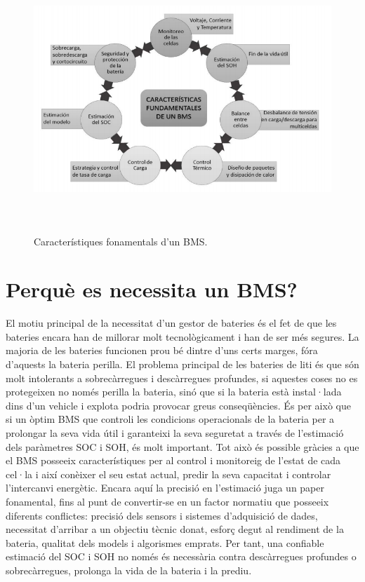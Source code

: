 \begin{figure}[H]
	\centering
    \includegraphics[width=\textwidth, height=10cm] {BMS/diagramabms.png}
    \caption{Característiques fonamentals d'un BMS.}
\end{figure}

\section{Perquè es necessita un BMS?}
El motiu principal de la necessitat d'un gestor de bateries és el fet de que les bateries encara han de millorar molt tecnològicament i han de ser més segures. La majoria de les bateries funcionen prou bé dintre d'uns certs marges, fóra d'aquests la bateria perilla. El problema principal de les bateries de liti és que són molt intolerants a sobrecàrregues i descàrregues profundes, si aquestes coses no es protegeixen no només perilla la bateria, sinó que si la bateria està instal·lada dins d'un vehicle i explota podria provocar greus conseqüències. És per això que si un òptim BMS que controli les condicions operacionals de la bateria per a prolongar la seva vida útil i garanteixi la seva seguretat a través de l'estimació dels paràmetres SOC i SOH, és molt important. 
Tot això és possible gràcies a que el BMS posseeix característiques per al control i monitoreig de l'estat de cada cel·la i així conèixer el seu estat actual, predir la seva capacitat i controlar l'intercanvi energètic. Encara aquí la precisió en l'estimació juga un paper fonamental, fins al punt de convertir-se en un factor normatiu que posseeix diferents conflictes: precisió dels sensors i sistemes d'adquisició de dades, necessitat d'arribar a un objectiu tècnic donat, esforç degut al rendiment de la bateria, qualitat dels models i algorismes emprats. Per tant, una confiable estimació del SOC i SOH no només és \newline  necessària contra descàrregues profundes o sobrecàrregues, prolonga la vida de la bateria i la prediu.  

